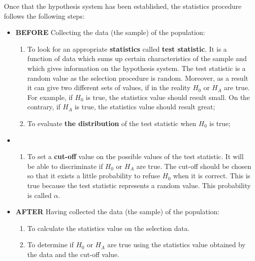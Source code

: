 \begin{frame}
  \vspace*{.25cm}
  Once that the hypothesis system has been established, the statistics procedure follows the following steps:
  \begin{itemize}
    \vspace*{.25cm}
    \item[\checkmark] \textbf{BEFORE} Collecting the data (the sample) of the population:
    \begin{enumerate}
    \vspace*{.25cm}
      \item To look for an appropriate \textbf{statistics} called \textbf{test statistic}. It is a function of data which sums up certain characteristics  of the sample and which gives information on the hypothesis system. The test statistic is a random value as the selection procedure is random. Moreover, as a result it can give two different sets of values, if in the reality $H_0$ or $ H_A $ are true. For example, if $H_0$ is true, the statistics value should result small. On the contrary, if $ H_A $ is true, the statistics value should result great;
      \vspace*{.25cm}
      \item To evaluate \textbf{the distribution} of the test statistic when $H_0$ is true;
    \end{enumerate}
  \end{itemize}
\end{frame}

\begin{frame}
  \vspace*{.25cm}
  \begin{itemize}
    \item[] 
    \begin{enumerate}
      \setcounter{enumi}{+2}
      \item To set a \textbf{cut-off} value on the possible values of the test statistic. It will be able to discriminate if $H_0$ or $ H_A $ are true. The cut-off should be chosen so that it exists a little probability to refuse $H_0$ when it is correct. This is true because the test statistic represents a random value. This probability is called {\boldmath$\alpha$}.
    \end{enumerate}
  \end{itemize}
  \begin{itemize}
    \item[\checkmark] \textbf{AFTER} Having collected the data (the sample) of the population:
    \vspace*{.25cm}
    \begin{enumerate}
      \item To calculate the statistics value on the selection data.
      \vspace*{.25cm}
      \item To determine if $H_0$ or $ H_A $ are true using the statistics value obtained by the data and the cut-off value.
    \end{enumerate}
  \end{itemize}
\end{frame}

